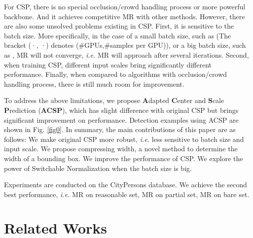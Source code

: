 \documentclass[twocolumn]{article}
\begin{document}
For CSP\cite{liu2019high}, there is no special occlusion/crowd handling process or more powerful backbone. And it achieves competitive MR with other methods. However, there are also some unsolved problems existing 
in CSP\cite{liu2019high}. First, it is sensitive to the batch size. More specifically, in the case of a small batch size, such as (The bracket (·, ·) denotes (\#GPUs,\#samples per GPU)), or a big batch size, such as , MR will not converge, \textit{i.e.} MR will approach  after several iterations. Second, when training CSP\cite{liu2019high}, different input scales bring significantly different performance. Finally, when compared to algorithms with occlusion/crowd handling process, there is still much room for improvement.\par 
To address the above limitations, we propose \textbf{A}dapted \textbf{C}enter and \textbf{S}cale \textbf{P}rediction (\textbf{ACSP}), which has slight difference with original CSP\cite{liu2019high} but brings significant improvement on performance. Detection examples using ACSP are shown in Fig. \ref{fig0}. In summary, the main contributions of this paper are as follows:  We make original CSP\cite{liu2019high} more robust, \textit{i.e.} less sensitive to batch size and input scale. We propose compressing width, a novel method to determine the width of a bounding box. We improve the performance of CSP\cite{liu2019high}.   We explore the power of Switchable Normalization when the batch size is big.\par 
Experiments are conducted on the CityPersons\cite{zhang2017citypersons} database. We achieve the second best performance, \textit{i.e.}  MR on reasonable set,  MR on partial set,  MR on bare set.

\begin{figure*}[htbp]
\centering
{}
\quad
{}
\quad
{}
\quad
{}
\caption{We use CityPersons test set to illustrate our ACSP detection ability. It is worthy to mention that, without any occlusion handling method, small and occlusion pedestrian can still be detected. The detections are shown in green rectangle boxes.}
\label{fig0}
\end{figure*}


\section{Related Works}
\end{document}
